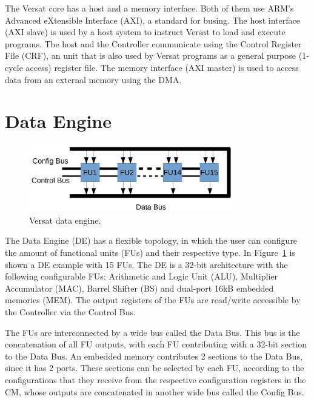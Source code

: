 The Versat core has a host and a memory interface. Both of them use ARM’s
Advanced eXtensible Interface (AXI), a standard for busing. The host interface
(AXI slave) is used by a host system to instruct Versat to load and execute
programs. The host and the Controller communicate using the Control Register
File (CRF), an unit that is also used by Versat programs as a general purpose
(1-cycle access) register file. The memory interface (AXI master) is used to
access data from an external memory using the DMA.



\section{Data Engine}
\label{section:data}

\begin{figure}[!htb]
	\centering
	\includegraphics[width=0.8\textwidth]{Figures/de.png}
	\caption{Versat data engine.}
	\label{fig:de}
\end{figure}

The Data Engine (DE) has a flexible topology, in which the user can configure
the amount of functional units (FUs) and their respective type. In
Figure~\ref{fig:de} is shown a DE example with 15 FUs. The DE is a 32-bit
architecture with the following configurable FUs: Arithmetic and Logic Unit
(ALU), Multiplier Accumulator (MAC), Barrel Shifter (BS) and dual-port 16kB
embedded memories (MEM). The output registers of the FUs are read/write
accessible by the Controller via the Control Bus.

The FUs are interconnected by a wide bus called the Data Bus. This bus is the
concatenation of all FU outputs, with each FU contributing with a 32-bit section
to the Data Bus. An embedded memory contributes 2 sections to the Data Bus,
since it has 2 ports. These sections can be selected by each FU, according to
the configurations that they receive from the respective configuration registers
in the CM, whose outputs are concatenated in another wide bus called the Config
Bus.

